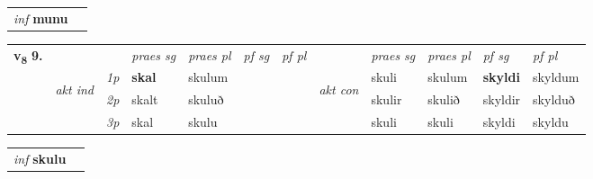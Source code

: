 \begin{tabular}{ll} \textit{inf}  \textbf{munu}
\end{tabular}



\begin{tabular}{llllllllllll} \toprule
\multirow{4}{*}{{{\textbf{v{\textsubscript{8}}} \Large{\textbf{9.}}}}}  & &   &  \textit{praes sg}  & \textit{praes pl}  &\textit{ pf sg} & \textit{pf pl} &  &  \textit{praes sg}  & \textit{praes pl}  & \textit{pf sg} & \textit{pf pl } \\*
	\cmidrule{4-7} \cmidrule{9-12}
 & \multirow{3}{*}{\begin{turn}{90}\textit{akt ind}\end{turn}} & {\textit{1p}} & \textbf{skal} & skulum    & \textbf{} & \textbf{} & \multirow{3}{*}{\begin{turn}{90}\textit{akt con}\end{turn}} &skuli & skulum & \textbf{skyldi} & skyldum\\*
& &  {\textit{2p}} &  skalt  & skuluð   &  &  & & skulir & skulið & skyldir & skylduð \\*
& &  {\textit{3p}} & skal & skulu   &  &  & & skuli & skuli& skyldi & skyldu  \\*
\cmidrule{4-7} \cmidrule{9-12}
\end{tabular}


\begin{tabular}{ll} \textit{inf}  \textbf{skulu}
\end{tabular}
